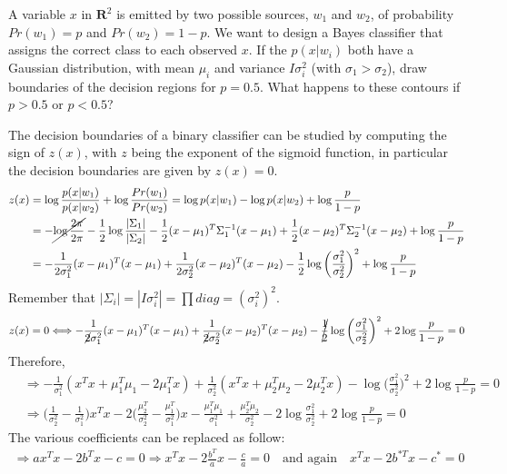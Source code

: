 \Exercise[number={4}]
A variable \(x\) in \(\mathbf{R}^2\) is emitted by two possible sources,
\(w_1\) and \(w_2\), of probability \(Pr(w_1)=p\) and \(Pr(w_2)=1-p\). 
We want to design a Bayes classifier that assigns the correct class to each
observed \(x\). If the \(p(x|w_i)\) both have a Gaussian distribution, with
mean \(\mu_i\) and variance \(I\sigma_i^2\) (with \(\sigma_1>\sigma_2\)),
draw boundaries of the decision regions for \(p=0.5\).
What happens to these contours if \(p>0.5\) or \(p<0.5\)?

\Answer[number={4}]
The decision boundaries of a binary classifier can be studied by computing the
sign of \(z(x)\), with \(z\) being the exponent of the sigmoid function, in
particular the decision boundaries are given by \(z(x)=0\).
\begin{align*}
    z(x)
    &=\log{\frac{p(x|w_1)}{p(x|w_2)}} + \log{\frac{Pr(w_1)}{Pr(w_2)}}
    =\log{p(x|w_1)}-\log{p(x|w_2)}+\log{\frac{p}{1-p}}\\
    &=-\cancel{\log{\frac{2\pi}{2\pi}}}-\frac{1}{2}\log{\frac{|\Sigma_1|}{|\Sigma_2|}}-\frac{1}{2}(x-\mu_1)^T\Sigma_1^{-1}(x-\mu_1)+\frac{1}{2}(x-\mu_2)^T\Sigma_2^{-1}(x-\mu_2)+\log{\frac{p}{1-p}}\\
    &=-\frac{1}{2\sigma_1^2}(x-\mu_1)^T(x-\mu_1)+\frac{1}{2\sigma_2^2}(x-\mu_2)^T(x-\mu_2)-\frac{1}{2}\log{\biggl(\frac{\sigma_1^2}{\sigma_2^2}\biggr)^2}+\log{\frac{p}{1-p}}
\end{align*}
Remember that \(|\Sigma_i|=|I\sigma_i^2|=\prod{diag}=(\sigma_i^2)^2\).
\begin{align*}
    z(x)=0
    \Longleftrightarrow
    -\frac{1}{\cancel{2}\sigma_1^2}(x-\mu_1)^T(x-\mu_1)+\frac{1}{\cancel{2}\sigma_2^2}(x-\mu_2)^T(x-\mu_2)-\cancel{\frac{1}{2}}\log{\biggl(\frac{\sigma_1^2}{\sigma_2^2}\biggr)^2}+2\log{\frac{p}{1-p}}=0
\end{align*}
Therefore,
\begin{align*}
    &\Rightarrow
    -\frac{1}{\sigma_1^2}(x^Tx+\mu_1^T\mu_1-2\mu_1^Tx)+\frac{1}{\sigma_2^2}(x^Tx+\mu_2^T\mu_2-2\mu_2^Tx)-\log{\biggl(\frac{\sigma_1^2}{\sigma_2^2}\biggr)^2}+2\log{\frac{p}{1-p}}=0\\
    &\Rightarrow
    \biggl(\frac{1}{\sigma_2^2}-\frac{1}{\sigma_1^2}\biggr)x^Tx-2\biggl(\frac{\mu_2^T}{\sigma_2^2}-\frac{\mu_1^T}{\sigma_1^2}\biggr)x-\frac{\mu_1^T\mu_1}{\sigma_1^2}+\frac{\mu_2^T\mu_2}{\sigma_2^2}-2\log{\frac{\sigma_1^2}{\sigma_2^2}}+2\log{\frac{p}{1-p}}=0
\end{align*}
The various coefficients can be replaced as follow:
\begin{align*}
    \Rightarrow
    ax^Tx-2b^Tx-c=0
    \Rightarrow
    x^Tx-2\frac{b^T}{a}x-\frac{c}{a}=0
    \quad\text{and again}\quad
    x^Tx-2b^{*T}x-c^*=0
\end{align*}
